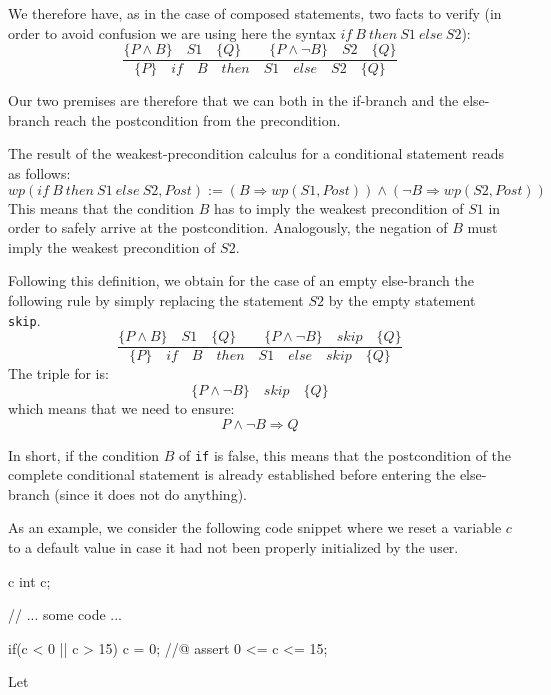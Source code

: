 We therefore have, as in the case of composed statements, two facts to
verify (in order to avoid confusion we are using here the syntax
$if\ B\ then\ S1\ else\ S2$):
$$\dfrac{\{P \wedge B\}\quad S1\quad \{Q\} \quad \quad \{P \wedge \neg B\}\quad S2\quad \{Q\}}{\{P\}\quad if\quad B\quad then\quad S1\quad else\quad S2 \quad \{Q\}}$$

Our two premises are therefore that we can both in the if-branch and the
else-branch reach the postcondition from the precondition.

The result of the weakest-precondition calculus for a conditional
statement reads as follows:
$$wp(if\ B\ then\ S1\ else\ S2 , Post) := (B \Rightarrow wp(S1, Post)) \wedge (\neg B \Rightarrow wp(S2, Post))$$
This means that the condition $B$ has to imply the weakest
precondition of $S1$ in order to safely arrive at the postcondition.
Analogously, the negation of $B$ must imply the weakest precondition
of $S2$.





Following this definition, we obtain for the case of an empty else-branch the
following rule by simply replacing the statement $S2$ by the empty
statement \texttt{skip}.
$$\dfrac{\{P \wedge B\}\quad S1\quad \{Q\} \quad \quad \{P \wedge \neg B\}\quad skip\quad \{Q\}}{\{P\}\quad if\quad B\quad then\quad S1\quad else\quad skip \quad \{Q\}}$$
The triple for  is:
$$\{P \wedge \neg B\}\quad skip\quad \{Q\}$$
which means that we need to ensure:
$$P \wedge \neg B \Rightarrow Q$$

In short, if the condition $B$ of \texttt{if} is false, this means
that the postcondition of the complete conditional statement is already
established before entering the else-branch (since it does not do
anything).



As an example, we consider the following code snippet where we reset a
variable $c$ to a default value in case it had not been properly
initialized by the user.



\begin{CodeBlock}{c}
int c;

// ... some code ...

if(c < 0 || c > 15){
  c = 0;
}
//@ assert 0 <= c <= 15;
\end{CodeBlock}



Let



